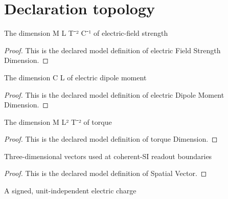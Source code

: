 \section{Declaration topology}
\begin{definition}
  \label{def:physics:phyx-mini-0996:phyxminiproblems-problemphyxmini0996-electricfieldstrengthdimension}
  The dimension M L T⁻² C⁻¹ of electric-field strength
\end{definition}
\begin{proof}
  This is the declared model definition of electric Field Strength Dimension.
\end{proof}
\begin{definition}
  \label{def:physics:phyx-mini-0996:phyxminiproblems-problemphyxmini0996-electricdipolemomentdimension}
  The dimension C L of electric dipole moment
\end{definition}
\begin{proof}
  This is the declared model definition of electric Dipole Moment Dimension.
\end{proof}
\begin{definition}
  \label{def:physics:phyx-mini-0996:phyxminiproblems-problemphyxmini0996-torquedimension}
  The dimension M L² T⁻² of torque
\end{definition}
\begin{proof}
  This is the declared model definition of torque Dimension.
\end{proof}
\begin{definition}
  \label{def:physics:phyx-mini-0996:phyxminiproblems-problemphyxmini0996-spatialvector}
  Three-dimensional vectors used at coherent-SI readout boundaries
\end{definition}
\begin{proof}
  This is the declared model definition of Spatial Vector.
\end{proof}
\begin{definition}
  \label{def:physics:phyx-mini-0996:phyxminiproblems-problemphyxmini0996-signedchargequantity}
  A signed, unit-independent electric charge
\end{definition}
